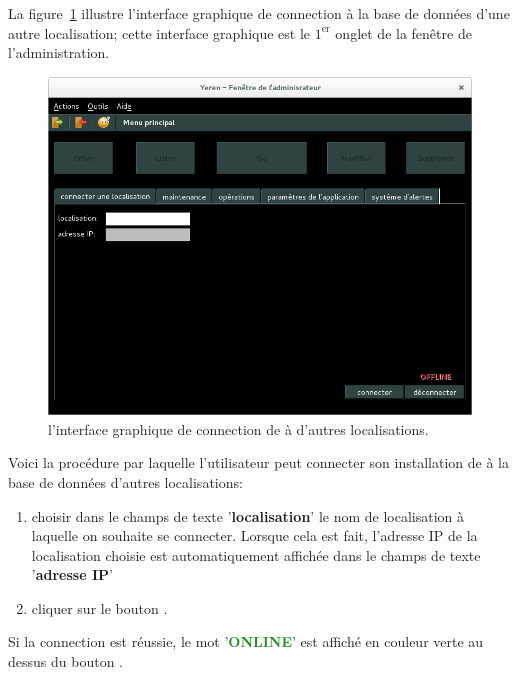 
La figure~\ref{fig:yeren-admin-connection-autres-db}
illustre l'interface graphique de connection \`a la
base de donn\'ees d'une autre localisation;
cette interface graphique est le $1^{\text{er}}$ onglet
de la fen\^etre de l'administration.

\begin{figure}[!htpb]
	\centering
	\includegraphics[scale=0.45]{images/yeren-admin-connection-autres-db.png}
	\caption{l'interface graphique de connection de
		\yeren \`a d'autres localisations.}\label{fig:yeren-admin-connection-autres-db}
\end{figure}

Voici la proc\'edure par laquelle l'utilisateur peut
connecter son installation de \yeren \`a la base de donn\'ees
d'autres localisations:
\begin{enumerate}[1)]
	\item choisir dans le champs de texte '\textbf{localisation}'
		le nom de localisation \`a laquelle on souhaite
		se connecter. Lorsque cela est fait, l'adresse IP
		de la localisation choisie est automatiquement
		affich\'ee dans le champs de texte '\textbf{adresse IP}'
	
	\item cliquer sur le bouton .
\end{enumerate}

Si la connection est r\'eussie, le mot 
'\textbf{\textcolor{forestgreen}{ONLINE}}' est affich\'e en
couleur verte au dessus du bouton .

